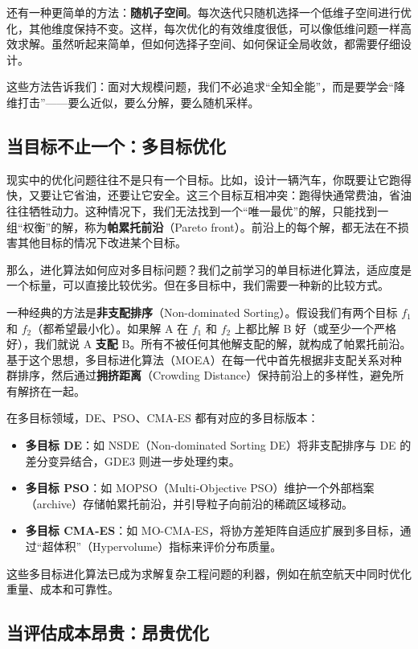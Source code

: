 \documentclass[lang=cn,zihao=-4,a4paper,fontset=windows]{beautybook}
\begin{document}
还有一种更简单的方法：\textbf{随机子空间}。每次迭代只随机选择一个低维子空间进行优化，其他维度保持不变。这样，每次优化的有效维度很低，可以像低维问题一样高效求解。虽然听起来简单，但如何选择子空间、如何保证全局收敛，都需要仔细设计。

这些方法告诉我们：面对大规模问题，我们不必追求“全知全能”，而是要学会“降维打击”——要么近似，要么分解，要么随机采样。

\subsection{当目标不止一个：多目标优化}

现实中的优化问题往往不是只有一个目标。比如，设计一辆汽车，你既要让它跑得快，又要让它省油，还要让它安全。这三个目标互相冲突：跑得快通常费油，省油往往牺牲动力。这种情况下，我们无法找到一个“唯一最优”的解，只能找到一组“权衡”的解，称为\textbf{帕累托前沿}（Pareto front）。前沿上的每个解，都无法在不损害其他目标的情况下改进某个目标。

那么，进化算法如何应对多目标问题？我们之前学习的单目标进化算法，适应度是一个标量，可以直接比较优劣。但在多目标中，我们需要一种新的比较方式。

一种经典的方法是\textbf{非支配排序}（Non-dominated Sorting）。假设我们有两个目标 $f_1$ 和 $f_2$（都希望最小化）。如果解 A 在 $f_1$ 和 $f_2$ 上都比解 B 好（或至少一个严格好），我们就说 A \textbf{支配} B。所有不被任何其他解支配的解，就构成了帕累托前沿。基于这个思想，多目标进化算法（MOEA）在每一代中首先根据非支配关系对种群排序，然后通过\textbf{拥挤距离}（Crowding Distance）保持前沿上的多样性，避免所有解挤在一起。

在多目标领域，DE、PSO、CMA-ES 都有对应的多目标版本：

\begin{itemize}
    \item \textbf{多目标 DE}：如 NSDE（Non-dominated Sorting DE）将非支配排序与 DE 的差分变异结合，GDE3 则进一步处理约束。
    \item \textbf{多目标 PSO}：如 MOPSO（Multi-Objective PSO）维护一个外部档案（archive）存储帕累托前沿，并引导粒子向前沿的稀疏区域移动。
    \item \textbf{多目标 CMA-ES}：如 MO-CMA-ES，将协方差矩阵自适应扩展到多目标，通过“超体积”（Hypervolume）指标来评价分布质量。
\end{itemize}

这些多目标进化算法已成为求解复杂工程问题的利器，例如在航空航天中同时优化重量、成本和可靠性。

\subsection{当评估成本昂贵：昂贵优化}
\end{document}
